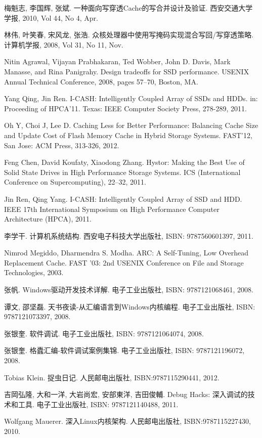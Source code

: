 \begin{thebibliography}
梅魁志, 李国辉, 张斌. 一种面向写穿透Cache的写合并设计及验证. 西安交通大学学报, 2010, Vol 44, No 4, Apr.

林伟, 叶笑春, 宋风龙, 张浩. 众核处理器中使用写掩码实现混合写回/写穿透策略. 计算机学报, 2008, Vol 31, No 11, Nov.

Nitin Agrawal, Vijayan Prabhakaran, Ted Wobber, John D. Davis, Mark Manasse, and Rina Panigrahy. Design tradeoffs for SSD performance. USENIX Annual Technical Conference, 2008, pages 57–70, Boston, MA.

Yang Qing, Jin Ren. I-CASH: Intelligently Coupled Array of SSDs and HDDs. in: Proceeding of HPCA'11. Texas: IEEE Computer Society Press, 278-289, 2011.

Oh Y, Choi J, Lee D. Caching Less for Better Performance: Balancing Cache Size and Update Cost of Flash Memory Cache in Hybrid Storage Systems. FAST'12, San Jose: ACM Press, 313-326, 2012.

Feng Chen, David Koufaty, Xiaodong Zhang. Hystor: Making the Best Use of Solid State Drives in High Performance Storage Systems. ICS (International Conference on Supercomputing), 22–32, 2011.

Jin Ren, Qing Yang. I-CASH: Intelligently Coupled Array of SSD and HDD. IEEE 17th International Symposium on High Performance Computer Architecture (HPCA), 2011.

李学干. 计算机系统结构. 西安电子科技大学出版社, ISBN: 9787560601397, 2011.

Nimrod Megiddo, Dharmendra S. Modha. ARC: A Self-Tuning, Low Overhead Replacement Cache. FAST ’03: 2nd USENIX Conference on File and Storage Technologies, 2003.

张帆. Windows驱动开发技术详解. 电子工业出版社, ISBN: 9787121068461, 2008.

谭文, 邵坚磊. 天书夜读-从汇编语言到Windows内核编程. 电子工业出版社, ISBN: 9787121073397, 2008.

张银奎. 软件调试. 电子工业出版社, ISBN: 9787121064074, 2008.

张银奎. 格蠹汇编-软件调试案例集锦. 电子工业出版社, ISBN: 9787121196072, 2008.

Tobias Klein. 捉虫日记. 人民邮电出版社, ISBN:9787115290441, 2012.

吉岡弘隆, 大和一洋, 大岩尚宏, 安部東洋, 吉田俊輔. Debug Hacks: 深入调试的技术和工具. 电子工业出版社, ISBN: 9787121140488, 2011.

Wolfgang Mauerer. 深入Linux内核架构. 人民邮电出版社, ISBN:9787115227430, 2010.

\end{thebibliography}
